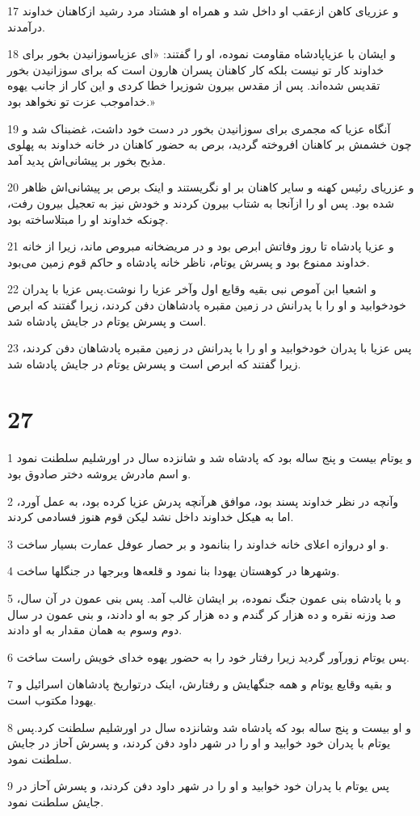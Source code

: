 \par 17 و عزریای کاهن ازعقب او داخل شد و همراه او هشتاد مرد رشید ازکاهنان خداوند درآمدند.
\par 18 و ایشان با عزیاپادشاه مقاومت نموده، او را گفتند: «ای عزیاسوزانیدن بخور برای خداوند کار تو نیست بلکه کار کاهنان پسران هارون است که برای سوزانیدن بخور تقدیس شده‌اند. پس از مقدس بیرون شوزیرا خطا کردی و این کار از جانب یهوه خداموجب عزت تو نخواهد بود.»
\par 19 آنگاه عزیا که مجمری برای سوزانیدن بخور در دست خود داشت، غضبناک شد و چون خشمش بر کاهنان افروخته گردید، برص به حضور کاهنان در خانه خداوند به پهلوی مذبح بخور بر پیشانی‌اش پدید آمد.
\par 20 و عزریای رئیس کهنه و سایر کاهنان بر او نگریستند و اینک برص بر پیشانی‌اش ظاهر شده بود. پس او را ازآنجا به شتاب بیرون کردند و خودش نیز به تعجیل بیرون رفت، چونکه خداوند او را مبتلاساخته بود.
\par 21 و عزیا پادشاه تا روز وفاتش ابرص بود و در مریضخانه مبروص ماند، زیرا از خانه خداوند ممنوع بود و پسرش یوتام، ناظر خانه پادشاه و حاکم قوم زمین می‌بود.
\par 22 و اشعیا ابن آموص نبی بقیه وقایع اول وآخر عزیا را نوشت.پس عزیا با پدران خودخوابید و او را با پدرانش در زمین مقبره پادشاهان دفن کردند، زیرا گفتند که ابرص است و پسرش یوتام در جایش پادشاه شد.
\par 23 پس عزیا با پدران خودخوابید و او را با پدرانش در زمین مقبره پادشاهان دفن کردند، زیرا گفتند که ابرص است و پسرش یوتام در جایش پادشاه شد.
 
\chapter{27}

\par 1 و یوتام بیست و پنج ساله بود که پادشاه شد و شانزده سال در اورشلیم سلطنت نمود و اسم مادرش یروشه دختر صادوق بود.
\par 2 وآنچه در نظر خداوند پسند بود، موافق هرآنچه پدرش عزیا کرده بود، به عمل آورد، اما به هیکل خداوند داخل نشد لیکن قوم هنوز فسادمی کردند.
\par 3 و او دروازه اعلای خانه خداوند را بنانمود و بر حصار عوفل عمارت بسیار ساخت.
\par 4 وشهرها در کوهستان یهودا بنا نمود و قلعه‌ها وبرجها در جنگلها ساخت.
\par 5 و با پادشاه بنی عمون جنگ نموده، بر ایشان غالب آمد. پس بنی عمون در آن سال، صد وزنه نقره و ده هزار کر گندم و ده هزار کر جو به او دادند، و بنی عمون در سال دوم وسوم به همان مقدار به او دادند.
\par 6 پس یوتام زورآور گردید زیرا رفتار خود را به حضور یهوه خدای خویش راست ساخت.
\par 7 و بقیه وقایع یوتام و همه جنگهایش و رفتارش، اینک درتواریخ پادشاهان اسرائیل و یهودا مکتوب است.
\par 8 و او بیست و پنج ساله بود که پادشاه شد وشانزده سال در اورشلیم سلطنت کرد.پس یوتام با پدران خود خوابید و او را در شهر داود دفن کردند، و پسرش آحاز در جایش سلطنت نمود. 
\par 9 پس یوتام با پدران خود خوابید و او را در شهر داود دفن کردند، و پسرش آحاز در جایش سلطنت نمود.
 
